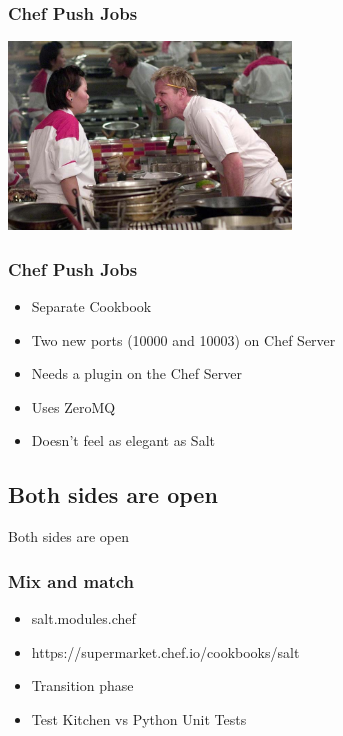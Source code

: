 \frame
{
  \frametitle{Chef Push Jobs}
  \begin{center}%
    \includegraphics[height=5cm]{images/pushy_chef.jpg}
  \end{center}%
}

\frame
{
  \frametitle{Chef Push Jobs}

  \begin{itemize}
  \item<1-> Separate Cookbook
  \item<2-> Two new ports (10000 and 10003) on Chef Server
  \item<3-> Needs a plugin on the Chef Server
  \item<4-> Uses ZeroMQ
  \item<5-> Doesn't feel as elegant as Salt
  \end{itemize}
}

\subsection{Both sides are open}
\frame
{
  \begin{center}
    Both sides are open
  \end{center}
}

\frame
{
  \frametitle{Mix and match}

  \begin{itemize}
  \item<1-> salt.modules.chef
  \item<2-> https://supermarket.chef.io/cookbooks/salt
  \item<3-> Transition phase
  \item<4-> Test Kitchen vs Python Unit Tests
  \end{itemize}
}
